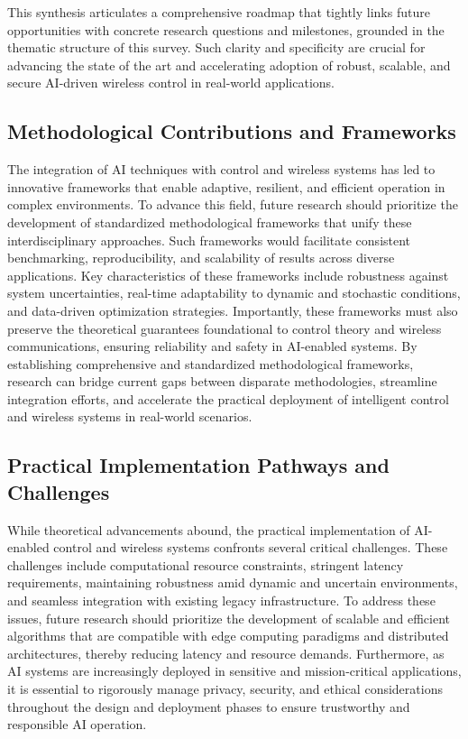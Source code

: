 \documentclass[sigconf]{acmart}
\begin{document}
This synthesis articulates a comprehensive roadmap that tightly links future opportunities with concrete research questions and milestones, grounded in the thematic structure of this survey. Such clarity and specificity are crucial for advancing the state of the art and accelerating adoption of robust, scalable, and secure AI-driven wireless control in real-world applications.

\subsection{Methodological Contributions and Frameworks}

The integration of AI techniques with control and wireless systems has led to innovative frameworks that enable adaptive, resilient, and efficient operation in complex environments. To advance this field, future research should prioritize the development of standardized methodological frameworks that unify these interdisciplinary approaches. Such frameworks would facilitate consistent benchmarking, reproducibility, and scalability of results across diverse applications. Key characteristics of these frameworks include robustness against system uncertainties, real-time adaptability to dynamic and stochastic conditions, and data-driven optimization strategies. Importantly, these frameworks must also preserve the theoretical guarantees foundational to control theory and wireless communications, ensuring reliability and safety in AI-enabled systems. By establishing comprehensive and standardized methodological frameworks, research can bridge current gaps between disparate methodologies, streamline integration efforts, and accelerate the practical deployment of intelligent control and wireless systems in real-world scenarios.

\subsection{Practical Implementation Pathways and Challenges}

While theoretical advancements abound, the practical implementation of AI-enabled control and wireless systems confronts several critical challenges. These challenges include computational resource constraints, stringent latency requirements, maintaining robustness amid dynamic and uncertain environments, and seamless integration with existing legacy infrastructure. To address these issues, future research should prioritize the development of scalable and efficient algorithms that are compatible with edge computing paradigms and distributed architectures, thereby reducing latency and resource demands. Furthermore, as AI systems are increasingly deployed in sensitive and mission-critical applications, it is essential to rigorously manage privacy, security, and ethical considerations throughout the design and deployment phases to ensure trustworthy and responsible AI operation.
\end{document}
